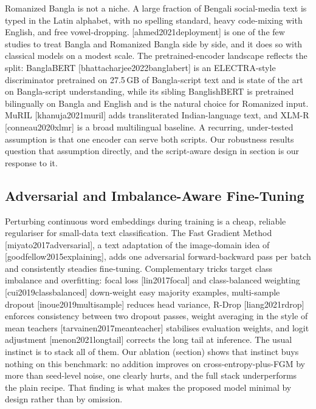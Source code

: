 \documentclass[11pt,a4paper]{article}
\def\citet#1{[#1]}%
\def\citep#1{[#1]}%
\def\cref#1{section}%
\begin{document}
Romanized Bangla is not a niche. A large fraction of Bengali social-media text is typed in the Latin alphabet, with no spelling standard, heavy code-mixing with English, and free vowel-dropping. \citet{ahmed2021deployment} is one of the few studies to treat Bangla and Romanized Bangla side by side, and it does so with classical models on a modest scale. The pretrained-encoder landscape reflects the split: BanglaBERT \citep{bhattacharjee2022banglabert} is an ELECTRA-style discriminator pretrained on 27.5\,GB of Bangla-script text and is state of the art on Bangla-script understanding, while its sibling BanglishBERT is pretrained bilingually on Bangla and English and is the natural choice for Romanized input. MuRIL \citep{khanuja2021muril} adds transliterated Indian-language text, and XLM-R \citep{conneau2020xlmr} is a broad multilingual baseline. A recurring, under-tested assumption is that one encoder can serve both scripts. Our robustness results question that assumption directly, and the script-aware design in \cref{sec:methodology} is our response to it.

\subsection{Adversarial and Imbalance-Aware Fine-Tuning}
\label{sec:rw-methods}

Perturbing continuous word embeddings during training is a cheap, reliable regulariser for small-data text classification. The Fast Gradient Method \citep{miyato2017adversarial}, a text adaptation of the image-domain idea of \citet{goodfellow2015explaining}, adds one adversarial forward-backward pass per batch and consistently steadies fine-tuning. Complementary tricks target class imbalance and overfitting: focal loss \citep{lin2017focal} and class-balanced weighting \citep{cui2019classbalanced} down-weight easy majority examples, multi-sample dropout \citep{inoue2019multisample} reduces head variance, R-Drop \citep{liang2021rdrop} enforces consistency between two dropout passes, weight averaging in the style of mean teachers \citep{tarvainen2017meanteacher} stabilises evaluation weights, and logit adjustment \citep{menon2021longtail} corrects the long tail at inference. The usual instinct is to stack all of them. Our ablation (\cref{sec:ablation-results}) shows that instinct buys nothing on this benchmark: no addition improves on cross-entropy-plus-FGM by more than seed-level noise, one clearly hurts, and the full stack underperforms the plain recipe. That finding is what makes the proposed model minimal by design rather than by omission.
\end{document}
